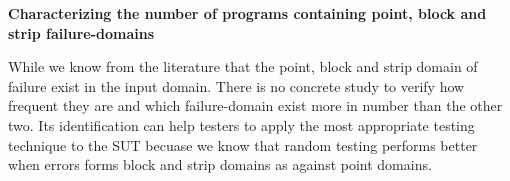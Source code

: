 \textbf{Characterizing the number of programs containing point, block and strip failure-domains}

While we know from the literature that the point, block and strip domain of failure exist in the input domain. There is no concrete study to verify how frequent they are and which failure-domain exist more in number than the other two. Its identification can help testers to apply the most appropriate testing technique to the SUT becuase we know that random testing performs better when errors forms block and strip domains as against point domains.\\
	




